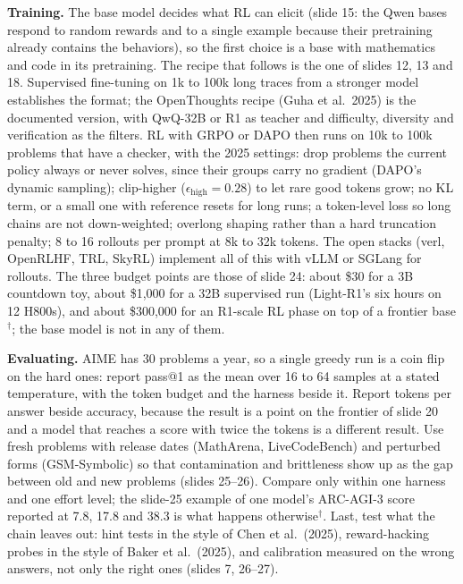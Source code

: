 \documentclass[11pt,letterpaper]{article}
\begin{document}
\textbf{Training.} The base model decides what RL can elicit (slide 15: the Qwen bases respond to random rewards and to a single example because their pretraining already contains the behaviors), so the first choice is a base with mathematics and code in its pretraining. The recipe that follows is the one of slides 12, 13 and 18. Supervised fine-tuning on 1k to 100k long traces from a stronger model establishes the format; the OpenThoughts recipe (Guha et al.\ 2025) is the documented version, with QwQ-32B or R1 as teacher and difficulty, diversity and verification as the filters. RL with GRPO or DAPO then runs on 10k to 100k problems that have a checker, with the 2025 settings: drop problems the current policy always or never solves, since their groups carry no gradient (DAPO's dynamic sampling); clip-higher ($\epsilon_{\text{high}}=0.28$) to let rare good tokens grow; no KL term, or a small one with reference resets for long runs; a token-level loss so long chains are not down-weighted; overlong shaping rather than a hard truncation penalty; 8 to 16 rollouts per prompt at 8k to 32k tokens. The open stacks (verl, OpenRLHF, TRL, SkyRL) implement all of this with vLLM or SGLang for rollouts. The three budget points are those of slide 24: about \$30 for a 3B countdown toy, about \$1,000 for a 32B supervised run (Light-R1's six hours on 12 H800s), and about \$300,000 for an R1-scale RL phase on top of a frontier base$^\dagger$; the base model is not in any of them.

\textbf{Evaluating.} AIME has 30 problems a year, so a single greedy run is a coin flip on the hard ones: report pass@1 as the mean over 16 to 64 samples at a stated temperature, with the token budget and the harness beside it. Report tokens per answer beside accuracy, because the result is a point on the frontier of slide 20 and a model that reaches a score with twice the tokens is a different result. Use fresh problems with release dates (MathArena, LiveCodeBench) and perturbed forms (GSM-Symbolic) so that contamination and brittleness show up as the gap between old and new problems (slides 25--26). Compare only within one harness and one effort level; the slide-25 example of one model's ARC-AGI-3 score reported at 7.8, 17.8 and 38.3 is what happens otherwise$^\dagger$. Last, test what the chain leaves out: hint tests in the style of Chen et al.\ (2025), reward-hacking probes in the style of Baker et al.\ (2025), and calibration measured on the wrong answers, not only the right ones (slides 7, 26--27).
\end{document}
